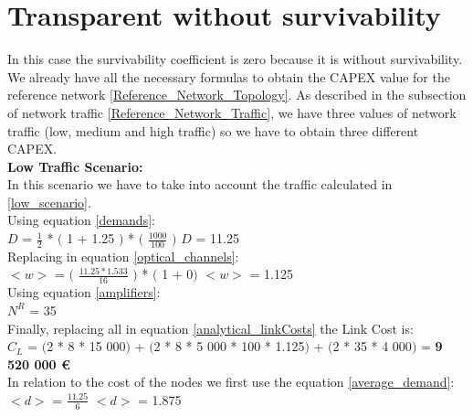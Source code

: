 \clearpage

\section{Transparent without survivability}\label{analytical_Transp_Survivability}

In this case the survivability coefficient is zero because it is without survivability.\\
We already have all the necessary formulas to obtain the CAPEX value for the reference network \ref{Reference_Network_Topology}. As described in the subsection of network traffic \ref{Reference_Network_Traffic}, we have three values of network traffic (low, medium and high traffic) so we have to obtain three different CAPEX.\\

\textbf{Low Traffic Scenario:}\\

In this scenario we have to take into account the traffic calculated in \ref{low_scenario}.\\

Using equation \ref{demands}:\\

$D$ = $\frac{1}{2}$ * $($ 1 + 1.25 $)$ * $($ $\frac{1000}{100}$ $)$ \qquad \qquad $D$ = 11.25\\

Replacing in equation \ref{optical_channels}:\\

$<w>$ = $($ $\frac{11.25 * 1.533}{16}$ $)$ * $($ 1 + 0$)$ \qquad \qquad $<w>$ = 1.125\\

Using equation \ref{amplifiers}:\\

$N^R$ = 35\\

Finally, replacing all in equation \ref{analytical_linkCosts} the Link Cost is:\\

$C_L$ = $($2 * 8 * 15 000$)$ + $($2 * 8 * 5 000 * 100 * 1.125$)$ + $($2 * 35 * 4 000$)$ = \textbf{9 520 000 \euro}\\

In relation to the cost of the nodes we first use the equation \ref{average_demand}:\\

$<d>$ = $\frac{11.25}{6}$ \qquad \qquad $<d>$ = 1.875\\


